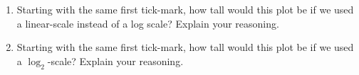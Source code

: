\documentclass[noauthor,nooutcomes,handout,hints,12pt]{ximera}
\begin{document}
\begin{question}
\begin{center}
    \end{center}
    \begin{enumerate}
        \item Starting with the same first tick-mark, how tall would this plot
              be if we used a linear-scale instead of a log scale? Explain your reasoning.
        \item Starting with the same first tick-mark, how tall would this plot
              be if we used a $\log_2$-scale? Explain your reasoning.
    \end{enumerate}
\end{question}

\mynewpage
\end{document}
